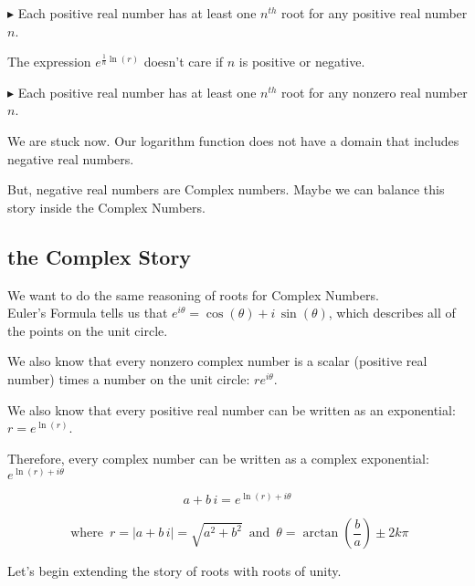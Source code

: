 \documentclass{ximera}
\begin{document}
$\blacktriangleright$ Each positive real number has at least one $n^{th}$ root for any positive real number $n$.


The expression $e^{\tfrac{1}{n} \ln(r)}$ doesn't care if $n$ is positive or negative.




$\blacktriangleright$ Each positive real number has at least one $n^{th}$ root for any nonzero real number $n$.



We are stuck now.  Our logarithm function does not have a domain that includes negative real numbers.

But, negative real numbers are Complex numbers.  Maybe we can balance this story inside the Complex Numbers. \\












\subsection*{the Complex Story}






We want to do the same reasoning of roots for Complex Numbers. \\


Euler's Formula tells us that $e^{i \theta} = \cos(\theta) + i \, \sin(\theta)$, which describes all of the points on the unit circle.

We also know that every nonzero complex number is a scalar (positive real number) times a number on the unit circle:  $r e^{i \theta}$.

We also know that every positive real number can be written as an exponential: $r = e^{\ln(r)}$.

Therefore, every complex number can be written as a complex exponential: $ e^{\ln(r) + i \theta}$


\[   a + b \, i =    e^{\ln(r) + i \theta}   \]

\[   \text{ where } \,   r = |a + b \, i| = \sqrt{a^2 + b^2}   \, \text{ and } \,   \theta = \arctan\left (\frac{b}{a} \right) \pm 2k\pi\]


Let's begin extending the story of roots with roots of unity.
\end{document}
